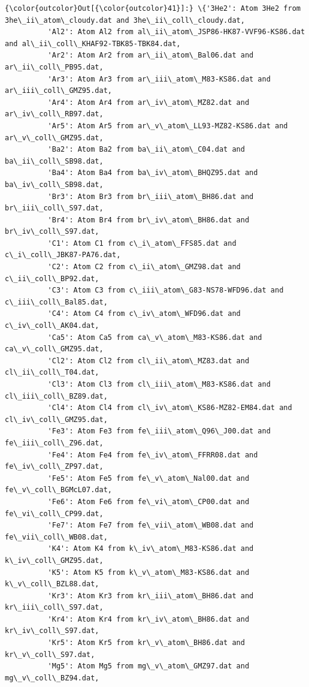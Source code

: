\documentclass{report}
\begin{document}
            \begin{Verbatim}[commandchars=\\\{\}]
{\color{outcolor}Out[{\color{outcolor}41}]:} \{'3He2': Atom 3He2 from 3he\_ii\_atom\_cloudy.dat and 3he\_ii\_coll\_cloudy.dat,
          'Al2': Atom Al2 from al\_ii\_atom\_JSP86-HK87-VVF96-KS86.dat and al\_ii\_coll\_KHAF92-TBK85-TBK84.dat,
          'Ar2': Atom Ar2 from ar\_ii\_atom\_Bal06.dat and ar\_ii\_coll\_PB95.dat,
          'Ar3': Atom Ar3 from ar\_iii\_atom\_M83-KS86.dat and ar\_iii\_coll\_GMZ95.dat,
          'Ar4': Atom Ar4 from ar\_iv\_atom\_MZ82.dat and ar\_iv\_coll\_RB97.dat,
          'Ar5': Atom Ar5 from ar\_v\_atom\_LL93-MZ82-KS86.dat and ar\_v\_coll\_GMZ95.dat,
          'Ba2': Atom Ba2 from ba\_ii\_atom\_C04.dat and ba\_ii\_coll\_SB98.dat,
          'Ba4': Atom Ba4 from ba\_iv\_atom\_BHQZ95.dat and ba\_iv\_coll\_SB98.dat,
          'Br3': Atom Br3 from br\_iii\_atom\_BH86.dat and br\_iii\_coll\_S97.dat,
          'Br4': Atom Br4 from br\_iv\_atom\_BH86.dat and br\_iv\_coll\_S97.dat,
          'C1': Atom C1 from c\_i\_atom\_FFS85.dat and c\_i\_coll\_JBK87-PA76.dat,
          'C2': Atom C2 from c\_ii\_atom\_GMZ98.dat and c\_ii\_coll\_BP92.dat,
          'C3': Atom C3 from c\_iii\_atom\_G83-NS78-WFD96.dat and c\_iii\_coll\_Bal85.dat,
          'C4': Atom C4 from c\_iv\_atom\_WFD96.dat and c\_iv\_coll\_AK04.dat,
          'Ca5': Atom Ca5 from ca\_v\_atom\_M83-KS86.dat and ca\_v\_coll\_GMZ95.dat,
          'Cl2': Atom Cl2 from cl\_ii\_atom\_MZ83.dat and cl\_ii\_coll\_T04.dat,
          'Cl3': Atom Cl3 from cl\_iii\_atom\_M83-KS86.dat and cl\_iii\_coll\_BZ89.dat,
          'Cl4': Atom Cl4 from cl\_iv\_atom\_KS86-MZ82-EM84.dat and cl\_iv\_coll\_GMZ95.dat,
          'Fe3': Atom Fe3 from fe\_iii\_atom\_Q96\_J00.dat and fe\_iii\_coll\_Z96.dat,
          'Fe4': Atom Fe4 from fe\_iv\_atom\_FFRR08.dat and fe\_iv\_coll\_ZP97.dat,
          'Fe5': Atom Fe5 from fe\_v\_atom\_Nal00.dat and fe\_v\_coll\_BGMcL07.dat,
          'Fe6': Atom Fe6 from fe\_vi\_atom\_CP00.dat and fe\_vi\_coll\_CP99.dat,
          'Fe7': Atom Fe7 from fe\_vii\_atom\_WB08.dat and fe\_vii\_coll\_WB08.dat,
          'K4': Atom K4 from k\_iv\_atom\_M83-KS86.dat and k\_iv\_coll\_GMZ95.dat,
          'K5': Atom K5 from k\_v\_atom\_M83-KS86.dat and k\_v\_coll\_BZL88.dat,
          'Kr3': Atom Kr3 from kr\_iii\_atom\_BH86.dat and kr\_iii\_coll\_S97.dat,
          'Kr4': Atom Kr4 from kr\_iv\_atom\_BH86.dat and kr\_iv\_coll\_S97.dat,
          'Kr5': Atom Kr5 from kr\_v\_atom\_BH86.dat and kr\_v\_coll\_S97.dat,
          'Mg5': Atom Mg5 from mg\_v\_atom\_GMZ97.dat and mg\_v\_coll\_BZ94.dat,

\end{Verbatim}
\end{document}
